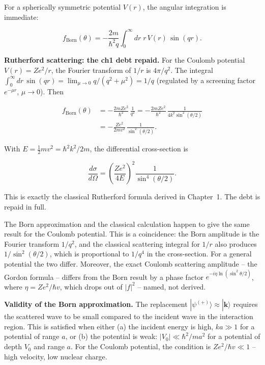 For a spherically symmetric potential $V(r)$, the angular integration is immediate:
\begin{linenomath}
\begin{equation}
f_{\text{Born}}(\theta) = -\frac{2m}{\hbar^{2}q}\int_{0}^{\infty} dr\;r\,V(r)\,\sin(qr).
\label{eq:born-spherical}
\end{equation}
\end{linenomath}

\medskip\noindent\textbf{Rutherford scattering: the ch1 debt repaid.}
For the Coulomb potential $V(r) = Ze^{2}/r$, the Fourier transform of $1/r$ is $4\pi/q^{2}$. The integral $\int_{0}^{\infty} dr\,\sin(qr) = \lim_{\mu\to0} q/(q^{2}+\mu^{2}) = 1/q$ (regulated by a screening factor $e^{-\mu r}$, $\mu\to 0$). Then
\begin{linenomath}
\begin{align}
f_{\text{Born}}(\theta) &= -\frac{2mZe^{2}}{\hbar^{2}}\,\frac{1}{q^{2}}
= -\frac{2mZe^{2}}{\hbar^{2}}\,\frac{1}{4k^{2}\sin^{2}(\theta/2)} \nonumber \\
&= -\frac{Ze^{2}}{2mv^{2}}\,\frac{1}{\sin^{2}(\theta/2)}.
\end{align}
\end{linenomath}
With $E = \tfrac12 mv^{2} = \hbar^{2}k^{2}/2m$, the differential cross-section is
\begin{linenomath}
\begin{equation}
\frac{d\sigma}{d\Omega} = \left(\frac{Ze^{2}}{4E}\right)^{2}\frac{1}{\sin^{4}(\theta/2)}.
\label{eq:rutherford-cross-section}
\end{equation}
\end{linenomath}
This is exactly the classical Rutherford formula derived in Chapter~1. The debt is repaid in full.

\begin{note}
The Born approximation and the classical calculation happen to give the same result for the Coulomb potential. This is a coincidence: the Born amplitude is the Fourier transform $1/q^{2}$, and the classical scattering integral for $1/r$ also produces $1/\sin^{2}(\theta/2)$, which is proportional to $1/q^{4}$ in the cross-section. For a general potential the two differ. Moreover, the exact Coulomb scattering amplitude -- the Gordon formula -- differs from the Born result by a phase factor $e^{-i\eta\ln(\sin^{2}\theta/2)}$, where $\eta = Ze^{2}/\hbar v$, which drops out of $|f|^{2}$ -- named, not derived.
\end{note}

\medskip\noindent\textbf{Validity of the Born approximation.}
The replacement $|\psi^{(+)}\rangle \approx |\bm k\rangle$ requires the scattered wave to be small compared to the incident wave in the interaction region. This is satisfied when either (a) the incident energy is high, $ka \gg 1$ for a potential of range $a$, or (b) the potential is weak: $|V_{0}| \ll \hbar^{2}/ma^{2}$ for a potential of depth $V_{0}$ and range $a$. For the Coulomb potential, the condition is $Ze^{2}/\hbar v \ll 1$ -- high velocity, low nuclear charge.

